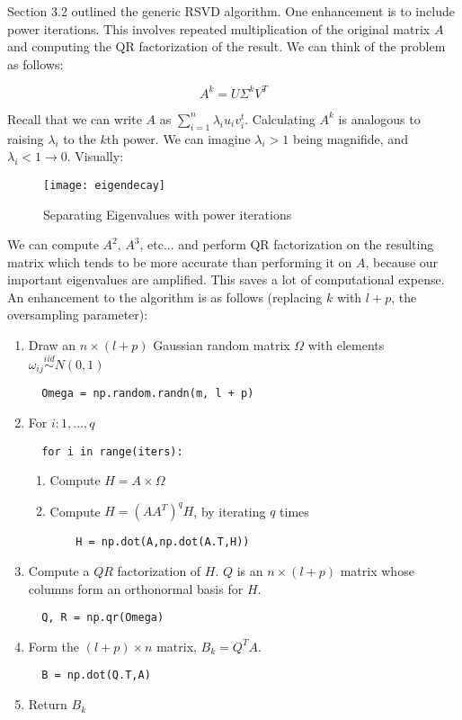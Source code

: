 \documentclass{article}
\begin{document}
Section 3.2 outlined the generic RSVD algorithm. One enhancement is to include power iterations. This involves repeated multiplication of the original matrix $A$ and computing the QR factorization of the result. We can think of the problem as follows:

$$A^{k} = U\Sigma^{k} V^{T}$$

Recall that we can write $A$ as $\sum_{i=1}^{n}\lambda_{i}u_{i}v_{i}^{t}$. Calculating $A^{k}$ is analogous to raising $\lambda_{i}$ to the $k$th power. We can imagine $\lambda_{i} > 1$ being magnifide, and $\lambda_{i} < 1 \rightarrow 0$. Visually:

\begin{figure}[H]
\centering
\texttt{[image: eigendecay]}
\caption{Separating Eigenvalues with power iterations}
\end{figure}

We can compute $A^{2}$, $A^{3}$, etc... and perform QR factorization on the resulting matrix which tends to be more accurate than performing it on $A$, because our important eigenvalues are amplified. This saves a lot of computational expense.
\\

An enhancement to the algorithm is as follows (replacing $k$ with $l + p$, the oversampling parameter):

\begin{enumerate}
\item Draw an $n \times (l+p)$ Gaussian random matrix $\Omega$ with elements $\omega_{ij} \stackrel{iid}{\sim} N(0,1)$
\begin{verbatim}
  Omega = np.random.randn(m, l + p)
\end{verbatim}
\item For $i: 1, ..., q$
\begin{verbatim}
  for i in range(iters):
\end{verbatim}
  \begin{enumerate}
    \item Compute $H = A \times \Omega$
    \item Compute $H = (AA^{T})^{q}H$, by iterating $q$ times
    \begin{verbatim}
    H = np.dot(A,np.dot(A.T,H))
    \end{verbatim}
  \end{enumerate}
\item Compute a $QR$ factorization of $H$. $Q$ is an $n \times (l+p)$ matrix whose columns form an orthonormal basis for $H$.
\begin{verbatim}
  Q, R = np.qr(Omega)
\end{verbatim}
\item Form the $(l + p) \times n$ matrix, $B_{k} = Q^{T}A$.
\begin{verbatim}
  B = np.dot(Q.T,A)
\end{verbatim}
\item Return $B_{k}$
\end{enumerate}
\end{document}
